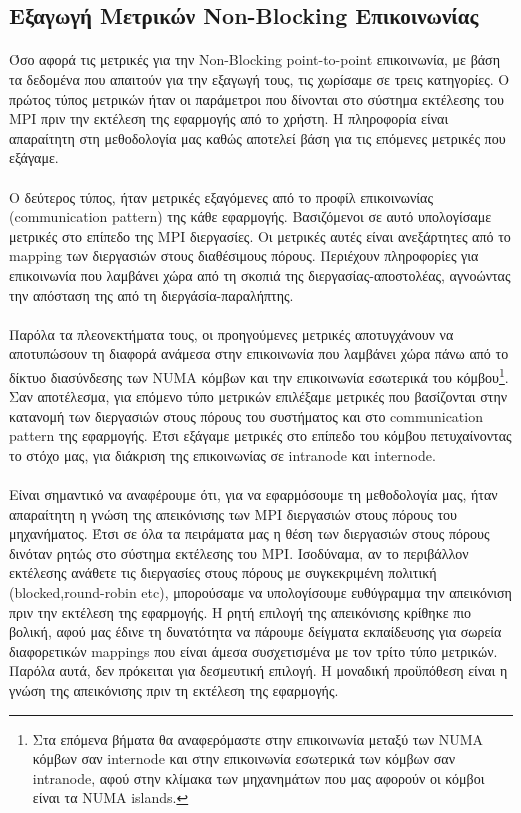 \subsection{Εξαγωγή Μετρικών Non-Blocking Επικοινωνίας}
\paragraph{}
Όσο αφορά τις μετρικές για την Non-Blocking point-to-point επικοινωνία, με βάση τα δεδομένα που απαιτούν για την εξαγωγή τους, τις χωρίσαμε σε τρεις κατηγορίες. Ο πρώτος τύπος μετρικών ήταν οι παράμετροι που δίνονται στο σύστημα εκτέλεσης του MPI πριν την εκτέλεση της εφαρμογής από το χρήστη. Η πληροφορία είναι απαραίτητη στη μεθοδολογία μας καθώς αποτελεί βάση για τις επόμενες μετρικές που εξάγαμε.
\paragraph{}
Ο δεύτερος τύπος, ήταν μετρικές εξαγόμενες από το προφίλ επικοινωνίας (com\-munication pattern) της κάθε εφαρμογής. Βασιζόμενοι σε αυτό υπολογίσαμε μετρικές στο επίπεδο της MPI διεργασίες. Οι μετρικές αυτές είναι ανεξάρτητες από το mapping των διεργασιών στους διαθέσιμους πόρους. Περιέχουν πληροφορίες για επικοινωνία που λαμβάνει χώρα από τη σκοπιά της διεργασίας-αποστολέας, αγνοώντας την απόσταση της από τη διεργάσία-παραλήπτης.
\paragraph{}
Παρόλα τα πλεονεκτήματα τους, οι προηγούμενες μετρικές αποτυγχάνουν να αποτυπώσουν τη διαφορά ανάμεσα στην επικοινωνία που λαμβάνει χώρα πάνω από το δίκτυο διασύνδεσης των NUMA κόμβων και την επικοινωνία εσωτερικά του κόμβου\footnote{Στα επόμενα βήματα θα αναφερόμαστε στην επικοινωνία μεταξύ των NUMA κόμβων σαν internode και στην επικοινωνία εσωτερικά των κόμβων σαν intranode, αφού στην κλίμακα των μηχανημάτων που μας αφορούν οι κόμβοι είναι τα NUMA islands.}. Σαν αποτέλεσμα, για επόμενο τύπο μετρικών επιλέξαμε μετρικές που βασίζονται στην κατανομή των διεργασιών στους πόρους του συστήματος και στο communication pattern της εφαρμογής. Έτσι εξάγαμε μετρικές στο επίπεδο του κόμβου πετυχαίνοντας το στόχο μας, για διάκριση της επικοινωνίας σε intranode και internode. 

\paragraph{}
Είναι σημαντικό να αναφέρουμε ότι, για να εφαρμόσουμε τη μεθοδολογία μας, ήταν απαραίτητη η γνώση της απεικόνισης των MPI διεργασιών στους πόρους του μηχανήματος. Έτσι σε όλα τα πειράματα μας η θέση των διεργασιών στους πόρους δινόταν ρητώς στο σύστημα εκτέλεσης του MPI. Ισοδύναμα, αν το περιβάλλον εκτέλεσης ανάθετε τις διεργασίες στους πόρους με συγκεκριμένη πολιτική (blocked,round-robin etc), μπορούσαμε να υπολογίσουμε ευθύγραμμα την απεικόνιση πριν την εκτέλεση της εφαρμογής. Η ρητή επιλογή της απεικόνισης κρίθηκε πιο βολική, αφού μας έδινε τη δυνατότητα να πάρουμε δείγματα εκπαίδευσης για σωρεία διαφορετικών mappings που είναι άμεσα συσχετισμένα με τον τρίτο τύπο μετρικών. Παρόλα αυτά, δεν πρόκειται για δεσμευτική επιλογή. Η μοναδική προϋπόθεση είναι η γνώση της απεικόνισης πριν τη εκτέλεση της εφαρμογής.
